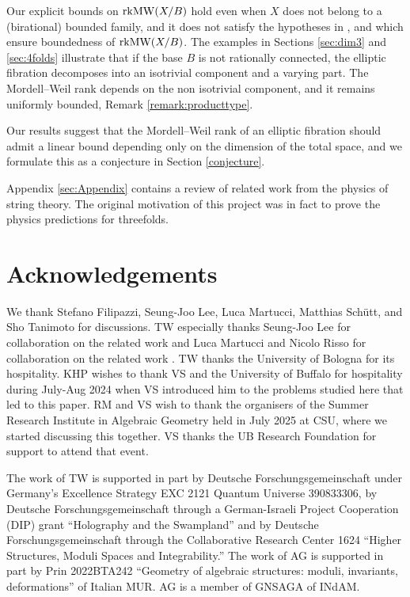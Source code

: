 \documentclass[11pt]{amsart}
\theoremstyle{definition}
\theoremstyle{definition}
\theoremstyle{remark}
\theoremstyle{remark}
\theoremstyle{definition}
\theoremstyle{conjecture}
\newcommand{\MW}{\mathrm{MW}}
\begin{document}
Our  explicit bounds on ${\rm rk} \MW(X/B)$ hold  even when  $X$ does not belong to a (birational) bounded family, and  it does not satisfy the hypotheses in  \cite{Filipazzi:2021dcw}, \cite{DiCerboSvaldi} and \cite{Birkar_2024}  which ensure boundedness of ${\rm rk} \MW(X/B)$. 
The examples in Sections \ref{sec:dim3} and \ref{sec:4folds} illustrate that if  the base $B$ is not  rationally connected, the elliptic fibration decomposes  
into an  isotrivial component and a  varying part. 
The Mordell{--}Weil rank depends on the non isotrivial component, and it remains uniformly bounded, 
Remark \ref{remark:producttype}. 
\color{black}

Our results suggest that the Mordell{--}Weil rank of an elliptic fibration should admit a linear bound depending only on the dimension of the total space, and we formulate this as a conjecture in Section \ref{conjecture}. 


Appendix \ref{sec:Appendix} contains a review of related work from the physics of string theory. The original motivation of this project was  in fact to prove the physics predictions for threefolds.

\color{black}


\section*{Acknowledgements}
We thank Stefano Filipazzi, Seung-Joo Lee, Luca Martucci, Matthias Schütt, and  Sho Tanimoto for discussions. 
TW especially thanks Seung-Joo Lee for collaboration on the related work \cite{Lee:2018ihr, Lee:2019skh} and Luca Martucci and Nicolo Risso for collaboration on the related work \cite{Martucci:2022krl}.
TW thanks the University of Bologna for its hospitality. KHP wishes to thank VS and the University of Buffalo for hospitality during July-Aug 2024 when VS introduced him to the problems studied here that led to this paper.
RM and VS wish to thank the organisers of the Summer Research Institute in Algebraic Geometry held in July 2025 at CSU, where we started discussing this together. 
VS thanks the UB Research Foundation for support to attend that event.

The work of TW is supported in part by Deutsche Forschungsgemeinschaft under Germany's Excellence Strategy EXC 2121 Quantum Universe 390833306, by Deutsche Forschungsgemeinschaft through a German-Israeli Project Cooperation (DIP) grant ``Holography and the Swampland'' and by Deutsche Forschungsgemeinschaft through the Collaborative Research Center 1624 ``Higher Structures, Moduli Spaces and Integrability.'' 
The work of AG is supported in part by 
Prin 2022BTA242 ``Geometry of algebraic structures: moduli, invariants, deformations'' of Italian MUR. AG is a member of GNSAGA of  INdAM. 
\end{document}
